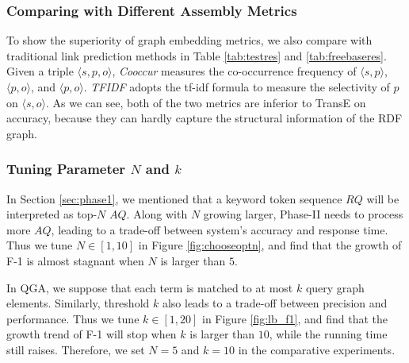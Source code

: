 \vspace{-0.05in}
\subsubsection{Comparing with Different Assembly Metrics}
To show the superiority of graph embedding metrics, we also compare with traditional link prediction methods in Table \ref{tab:testres} and \ref{tab:freebaseres}. Given a triple $\langle s,p,o \rangle$, \emph{Cooccur} measures the co-occurrence frequency of $\langle s,p \rangle$, $\langle p,o \rangle$, and $\langle p,o \rangle$. \emph{TFIDF} adopts the tf-idf formula to measure the selectivity of $p$ on $\langle s, o \rangle$. As we can see, both of the two metrics are inferior to TransE on accuracy, because they can hardly capture the structural information of the RDF graph.

\subsubsection{Tuning Parameter $N$ and $k$}

In Section \ref{sec:phase1}, we mentioned that a keyword token sequence $RQ$ will be interpreted as top-$N$ $AQ$.
Along with $N$ growing larger, Phase-II needs to process more $AQ$, leading to a trade-off between system's accuracy and response time. Thus we tune $N \in [1,10]$  in Figure \ref{fig:chooseoptn}, and find that the growth of F-1 is almost stagnant when $N$ is larger than $5$.

In QGA, we suppose that each term is matched to at most $k$ query graph elements. Similarly, threshold $k$ also leads to a trade-off between precision and performance. Thus we tune $k \in [1,20]$  in Figure \ref{fig:lb_f1}, and find that the growth trend of F-1 will stop when $k$ is larger than $10$, while the running time still raises. Therefore, we set $N=5$ and $k=10$ in the comparative experiments.


